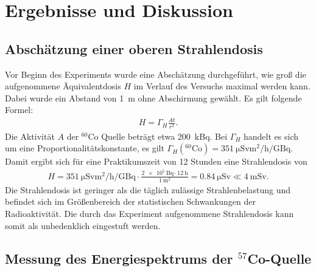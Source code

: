 \documentclass[a4paper,twoside,final]{article}
\begin{document}
\section{Ergebnisse und Diskussion}
\subsection{Abschätzung einer oberen Strahlendosis}
Vor Beginn des Experiments wurde eine Abschätzung durchgeführt, wie groß die aufgenommene Äquivalentdosis $H$ im Verlauf des Versuchs maximal werden kann. Dabei wurde ein Abstand von \SI{1}{\metre} ohne Abschirmung gewählt. Es gilt folgende Formel:
\begin{align}
  H = \Gamma_H \frac{A t}{r^2}.
\end{align}
Die Aktivität $A$ der $^{60}$Co Quelle beträgt etwa \SI{200}{\kilo\becquerel}. Bei $\Gamma_H$ handelt es sich um eine Proportionalitätskonstante, es gilt $\Gamma_H(^{60}\text{Co})= \SI{351}{\micro\sievert\metre\squared\per\hour\per\giga\becquerel}$. Damit ergibt sich für eine Praktikumszeit von 12 Stunden eine Strahlendosis von
\begin{align}
  H = \SI[per-mode=fraction]{351}{\micro\sievert\metre\squared\per\hour\per\giga\becquerel} \cdot\frac{\SI{2e5}{\becquerel}\cdot\SI{12}{\hour}}{\SI{1}{\metre\squared}}= \SI{0,84}{\micro\sievert} \ll \SI{4}{\milli\sievert}.
\end{align}
Die Strahlendosis ist geringer als die täglich zulässige Strahlenbelastung und befindet sich im Größenbereich der statistischen Schwankungen der Radioaktivität. Die durch das Experiment aufgenommene Strahlendosis kann somit als unbedenklich eingestuft werden.

\subsection{Messung des Energiespektrums der $^{57}$Co-Quelle}
\end{document}
